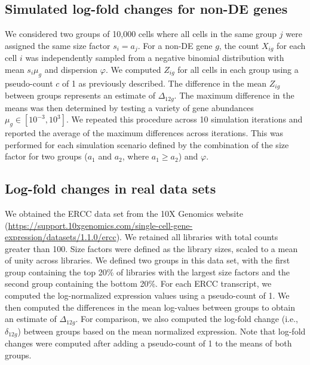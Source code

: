 \documentclass[10pt,letterpaper]{article}
\begin{document}
\subsection{Simulated log-fold changes for non-DE genes}
We considered two groups of 10,000 cells where all cells in the same group $j$ were assigned the same size factor $s_i=a_j$.
For a non-DE gene $g$, the count $X_{ig}$ for each cell $i$ was independently sampled from a negative binomial distribution with mean $s_i\mu_g$ and dispersion $\varphi$.
We computed $Z_{ig}$ for all cells in each group using a pseudo-count $c$ of 1 as previously described.
The difference in the mean $Z_{ig}$ between groups represents an estimate of $\Delta_{12g}$.
The maximum difference in the means was then determined by testing a variety of gene abundances $\mu_g \in [10^{-3}, 10^3]$.
We repeated this procedure across 10 simulation iterations and reported the average of the maximum differences across iterations.
This was performed for each simulation scenario defined by the combination of the size factor for two groups ($a_1$ and $a_2$, where $a_1 \ge a_2$) and $\varphi$.

\subsection{Log-fold changes in real data sets}
We obtained the ERCC data set from the 10X Genomics website (\url{https://support.10xgenomics.com/single-cell-gene-expression/datasets/1.1.0/ercc}).
We retained all libraries with total counts greater than 100.
Size factors were defined as the library sizes, scaled to a mean of unity across libraries.
We defined two groups in this data set, with the first group containing the top 20\% of libraries with the largest size factors and the second group containing the bottom 20\%.
For each ERCC transcript, we computed the log-normalized expression values using a pseudo-count of 1.
We then computed the differences in the mean log-values between groups to obtain an estimate of $\Delta_{12g}$.
For comparison, we also computed the log-fold change (i.e., $\delta_{12g}$) between groups based on the mean normalized expression.
Note that log-fold changes were computed after adding a pseudo-count of 1 to the means of both groups.
\end{document}
